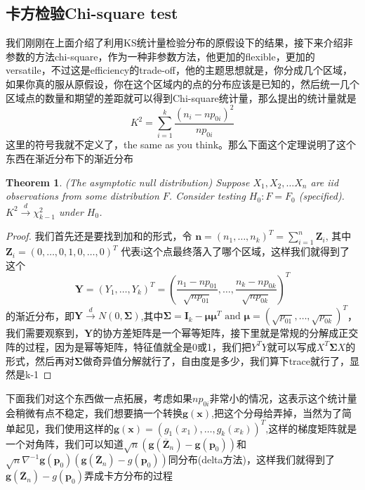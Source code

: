 \documentclass{article}
\newtheorem{theorem}{Theorem}[section]
\newtheorem*{proof}{Proof}
\begin{document}
\subsection{卡方检验Chi-square test}
我们刚刚在上面介绍了利用KS统计量检验分布的原假设下的结果，接下来介绍非参数的方法chi-square，作为一种非参数方法，他更加的flexible，更加的versatile，不过这是efficiency的trade-off，他的主题思想就是，你分成几个区域，如果你真的服从原假设，你在这个区域内的点的分布应该是已知的，然后统一几个区域点的数量和期望的差距就可以得到Chi-square统计量，那么提出的统计量就是
$$
K^2=\sum_{i=1}^k \frac{\left(n_i-n p_{0 i}\right)^2}{n p_{0 i}}
$$
这里的符号我就不定义了，the same as you think。那么下面这个定理说明了这个东西在渐近分布下的渐近分布
\begin{theorem}
	(The asymptotic null distribution) Suppose $X_1, X_2, \ldots X_n$ are iid observations from some distribution $F$. Consider testing $H_0: F=F_0$ (specified). $K^2 \stackrel{d}{\rightarrow} \chi_{k-1}^2$ under $H_0$.
\end{theorem}
\begin{proof}
我们首先还是要找到加和的形式，令 $\mathbf{n}=\left(n_1, \ldots, n_k\right)^T=\sum_{i=1}^n \mathbf{Z}_i$, 其中 $\mathbf{Z}_i=(0, \ldots, 0,1,0, \ldots, 0)^T$ 代表i这个点最终落入了哪个区域，这样我们就得到了这个
$$
\mathbf{Y}=\left(Y_1, \ldots, Y_k\right)^T=\left(\frac{n_1-n p_{01}}{\sqrt{n p_{01}}}, \ldots, \frac{n_k-n p_{0 k}}{\sqrt{n p_{0 k}}}\right)^T
$$
的渐近分布，即$\mathbf{Y}\stackrel{d}{\rightarrow}N(0,\boldsymbol{\Sigma})$,其中$\boldsymbol{\Sigma}=\mathbf{I}_k-\boldsymbol{\mu} \boldsymbol{\mu}^T \text { and } \boldsymbol{\mu}=\left(\sqrt{p_{01}}, \ldots, \sqrt{p_{0 k}}\right)^T$，我们需要观察到，$\mathbf{Y}$的协方差矩阵是一个幂等矩阵，接下里就是常规的分解成正交阵的过程，因为是幂等矩阵，特征值就全是0或1，我们把$Y^{T}Y$就可以写成$X^T\boldsymbol{\Sigma}X$的形式，然后再对$\boldsymbol{\Sigma}$做奇异值分解就行了，自由度是多少，我们算下trace就行了，显然是k-1
\end{proof}
下面我们对这个东西做一点拓展，考虑如果$np_{0i}$非常小的情况，这表示这个统计量会稍微有点不稳定，我们想要搞一个转换$\mathbf{g}(\mathbf{x})$,把这个分母给弄掉，当然为了简单起见，我们使用这样的$\mathbf{g}(\mathbf{x})=\left(g_1\left(x_1\right), \ldots, g_k\left(x_k\right)\right)^T$,这样的梯度矩阵就是一个对角阵，我们可以知道$\sqrt{n}\left(\mathbf{g}\left(\overline{\mathbf{Z}}_n\right)-\mathbf{g}\left(\mathbf{p}_0\right)\right)$和$\sqrt{n} \nabla^{-1} \mathbf{g}\left(\mathbf{p}_0\right)\left(\mathbf{g}\left(\overline{\mathbf{Z}}_n\right)-g\left(\mathbf{p}_0\right)\right)$同分布(delta方法)，这样我们就得到了$\mathbf{g}\left(\overline{\mathbf{Z}}_n\right)-g\left(\mathbf{p}_0\right)$弄成卡方分布的过程
\end{document}
